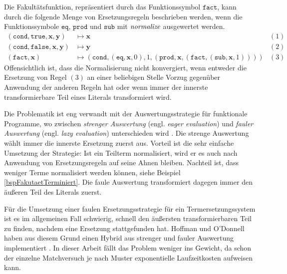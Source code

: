 \begin{beispiel} \label{bspFakutaetTerminiert}
Die Fakultätsfunktion, repräsentiert durch das Funktionssymbol $\texttt{fact}$, kann durch die folgende Menge von Ersetzungsregeln beschrieben werden, wenn die Funktionssymbole $\texttt{eq}$, $\texttt{prod}$ und $\texttt{sub}$ mit $\mathit{normalize}$ ausgewertet werden. 
\begin{align*}
    (\texttt{cond}, \texttt{true}, \mathbf x, \mathbf y) 
    &\mapsto \mathbf x 
    &(1)\\        
    (\texttt{cond}, \texttt{false}, \mathbf x, \mathbf y) 
    &\mapsto \mathbf y 
    &(2)\\        
    (\texttt{fact}, \mathbf x) 
    &\mapsto (\texttt{cond}, (\texttt{eq}, \mathbf x, 0), 1, (\texttt{prod}, \mathbf x, (\texttt{fact}, (\texttt{sub}, \mathbf x, 1)))) 
    &(3)
\end{align*}
Offensichtlich ist, dass die Normalisierung nicht konvergiert, wenn entweder die Ersetzung von Regel $(3)$ an einer beliebigen Stelle Vorzug gegenüber Anwendung der anderen Regeln hat oder wenn immer der innerste transformierbare Teil eines Literals transformiert wird.
\end{beispiel}

Die Problematik ist eng verwandt mit der Auswertungsstrategie für funktionale Programme, wo zwischen \textit{strenger Auswertung} (engl. \textit{eager evaluation}) und \textit{fauler Auswertung} (engl. \textit{lazy evaluation}) unterschieden wird  \cite{EvalStrategien}. Die strenge Auswertung wählt immer die innerste Ersetzung zuerst aus. Vorteil ist die sehr einfache Umsetzung der Strategie: Ist ein Teilterm normalisiert, wird er es auch nach Anwendung von Ersetzungsregeln auf seine Ahnen bleiben. Nachteil ist, dass weniger Terme normalisiert werden können, siehe Beispiel \ref{bspFakutaetTerminiert}. Die faule Auswertung transformiert dagegen immer den äußeren Teil des Literals zuerst. 

Für die Umsetzung einer faulen Ersetzungsstrategie für ein Termersetzungssystem ist es im allgemeinen Fall schwierig, schnell den äußersten transformierbaren Teil zu finden, nachdem eine Ersetzung stattgefunden hat. Hoffman und O'Donnell haben aus diesem Grund einen Hybrid aus strenger und fauler Auswertung implementiert \cite{hoffmann1982programming}.
 In dieser Arbeit fällt das Problem weniger ins Gewicht, da schon der einzelne Matchversuch je nach Muster exponentielle Laufzeitkosten aufweisen kann.








